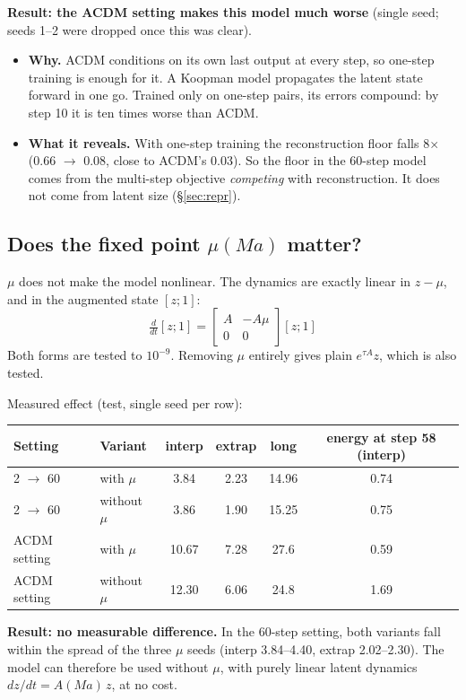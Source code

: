 \noindent \textbf{Result: the ACDM setting makes this model much worse} (single seed;
seeds 1--2 were dropped once this was clear).
\begin{itemize}
\item \textbf{Why.} ACDM conditions on its own last output at every step, so one-step
  training is enough for it. A Koopman model propagates the latent state forward in one go.
  Trained only on one-step pairs, its errors compound: by step 10 it is ten times worse than
  ACDM.
\item \textbf{What it reveals.} With one-step training the reconstruction floor falls 8$\times$
  (0.66 $\to$ 0.08, close to ACDM's 0.03). So the floor in the 60-step model comes from the
  multi-step objective \emph{competing} with reconstruction. It does not come from latent
  size (\S\ref{sec:repr}).
\end{itemize}

\subsection{Does the fixed point $\mu(Ma)$ matter?}\label{sec:mu}

$\mu$ does not make the model nonlinear. The dynamics are exactly linear in $z-\mu$, and in
the augmented state $[z;1]$:
\[
\tfrac{d}{dt}[z;1] = \begin{bmatrix}A & -A\mu\\ 0 & 0\end{bmatrix}[z;1]
\]
Both forms are tested to $10^{-9}$. Removing $\mu$ entirely gives plain $e^{\tau A}z$, which is
also tested.

Measured effect (test, single seed per row):
\begin{center}\small
\begin{tabular}{llcccc}
\toprule
Setting & Variant & interp & extrap & long & energy at step 58 (interp)\\
\midrule
2 $\to$ 60 & with $\mu$    & 3.84 & 2.23 & 14.96 & 0.74\\
2 $\to$ 60 & without $\mu$ & 3.86 & 1.90 & 15.25 & 0.75\\
ACDM setting & with $\mu$    & 10.67 & 7.28 & 27.6 & 0.59\\
ACDM setting & without $\mu$ & 12.30 & 6.06 & 24.8 & 1.69\\
\bottomrule
\end{tabular}
\end{center}

\noindent \textbf{Result: no measurable difference.} In the 60-step setting, both variants fall
within the spread of the three $\mu$ seeds (interp 3.84--4.40, extrap 2.02--2.30). The model
can therefore be used without $\mu$, with purely linear latent dynamics $dz/dt = A(Ma)\,z$, at
no cost.


